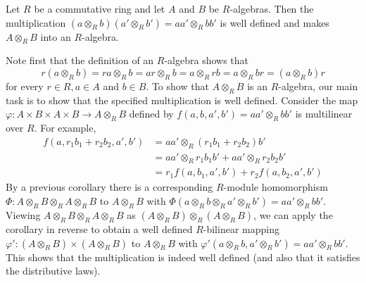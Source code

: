\documentclass[12pt, a4paper, twoside, openright, titlepage]{book}
\begin{document}
\begin{prop}{}{}
    Let $R$ be a commutative ring and let $A$ and $B$ be $R$-algebras. Then the multiplication $(a\otimes_Rb)(a'\otimes_Rb') = aa'\otimes_Rbb'$ is well defined and makes $A\otimes_RB$ into an $R$-algebra.
\end{prop}
\begin{proof*}{}{}
    Note first that the definition of an $R$-algebra shows that \begin{equation*}
        r(a\otimes_Rb) = ra\otimes_Rb = ar\otimes_Rb = a\otimes_Rrb = a\otimes_Rbr = (a\otimes_Rb)r
    \end{equation*}
    for every $r \in R,a \in A$ and $b \in B$. To show that $A\otimes_RB$ is an $R$-algebra, our main task is to show that the specified multiplication is well defined. Consider the map $\varphi:A\times B\times A \times B\rightarrow A\otimes_RB$ defined by $f(a,b,a',b') = aa'\otimes_Rbb'$ is multilinear over $R$. For example, \begin{align*}
        f(a,r_1b_1+r_2b_2,a',b') &= aa'\otimes_R(r_1b_1+r_2b_2)b' \\
        &= aa'\otimes_Rr_1b_1b' + aa'\otimes_Rr_2b_2b' \\
        &= r_1f(a,b_1,a',b')+r_2f(a,b_2,a',b')
    \end{align*}
    By a previous corollary there is a corresponding $R$-module homomorphism $\Phi:A\otimes_RB\otimes_RA\otimes_RB$ to $A\otimes_RB$ with $\Phi(a\otimes_Rb\otimes_Ra'\otimes_Rb') = aa'\otimes_Rbb'$. Viewing $A\otimes_RB\otimes_RA\otimes_RB$ as $(A\otimes_RB)\otimes_R(A\otimes_RB)$, we can apply the corollary in reverse to obtain a well defined $R$-bilinear mapping $\varphi':(A\otimes_RB)\times(A\otimes_RB)$ to $A\otimes_RB$ with $\varphi'(a\otimes_Rb,a'\otimes_Rb') = aa'\otimes_Rbb'$. This shows that the multiplication is indeed well defined (and also that it satisfies the distributive laws).
\end{proof*}
\end{document}
